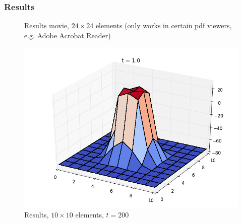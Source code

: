 \subsubsection{Results}
%
%
%


%
\begin{figure}[ht]
  \centering 
  
%  
%
%
  \caption{Results movie, $24 \times 24$ elements (only works in certain pdf viewers, e.g. Adobe Acrobat Reader)}
  \label{example-0401-current-run0-fig}
\end{figure}

\begin{figure}[ht]
  \centering 
  \includegraphics[width=0.9\columnwidth]{examples/example-0401/doc/figures/current_run_l1x1_n10x10_i1_s0_p1__t200.png} 
  \caption{Results, $10 \times 10$ elements, $t=200$}
  \label{example-0401-current-run1-fig}
\end{figure}

